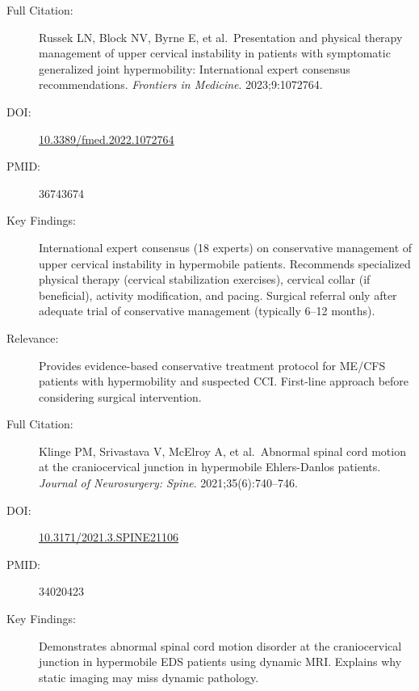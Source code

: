 \begin{description}
    \item[Full Citation:] Russek LN, Block NV, Byrne E, et al.\ Presentation and physical therapy management of upper cervical instability in patients with symptomatic generalized joint hypermobility: International expert consensus recommendations. \textit{Frontiers in Medicine}. 2023;9:1072764.
    \item[DOI:] \href{https://doi.org/10.3389/fmed.2022.1072764}{10.3389/fmed.2022.1072764}
    \item[PMID:] 36743674
    \item[Key Findings:] International expert consensus (18 experts) on conservative management of upper cervical instability in hypermobile patients. Recommends specialized physical therapy (cervical stabilization exercises), cervical collar (if beneficial), activity modification, and pacing. Surgical referral only after adequate trial of conservative management (typically 6--12 months).
    \item[Relevance:] Provides evidence-based conservative treatment protocol for ME/CFS patients with hypermobility and suspected CCI. First-line approach before considering surgical intervention.
\end{description}

\begin{description}
    \item[Full Citation:] Klinge PM, Srivastava V, McElroy A, et al.\ Abnormal spinal cord motion at the craniocervical junction in hypermobile Ehlers-Danlos patients. \textit{Journal of Neurosurgery: Spine}. 2021;35(6):740--746.
    \item[DOI:] \href{https://doi.org/10.3171/2021.3.SPINE21106}{10.3171/2021.3.SPINE21106}
    \item[PMID:] 34020423
    \item[Key Findings:] Demonstrates abnormal spinal cord motion disorder at the craniocervical junction in hypermobile EDS patients using dynamic MRI. Explains why static imaging may miss dynamic pathology.
\end{description}

